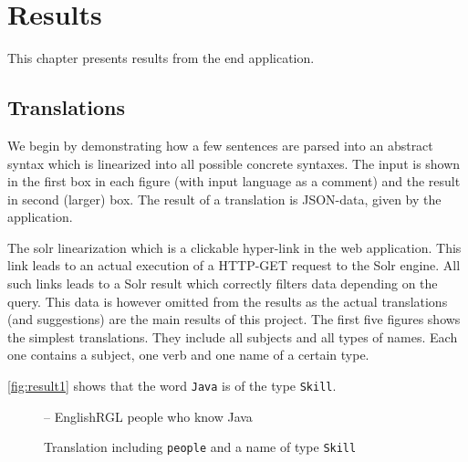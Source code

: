\chapter{Results}\label{ch:results}
This chapter presents results from the end application.

\section{Translations}
We begin by demonstrating how a few sentences are parsed into an abstract syntax which is linearized into all possible concrete syntaxes. The input is shown in the first box in each figure (with input language as a comment) and the result in second (larger) box. The result of a translation is JSON-data, given by the application.

The solr linearization which is a clickable hyper-link in the web application. This link leads to an actual execution of a HTTP-GET request to the Solr engine. All such links leads to a Solr result which correctly filters data depending on the query. This data is however omitted from the results as the actual translations (and suggestions) are the main results of this project.
\newline
\newline
The first five figures shows the simplest translations. They include all subjects and all types of names. Each one contains a subject, one verb and one name of a certain type.

\newpage
\autoref{fig:result1} shows that the word \texttt{Java} is of the type \texttt{Skill}.

\begin{figure}[H]
\begin{terminal}
-- EnglishRGL
people who know Java
\end{terminal}
\begin{json-small}
\end{json-small}
\caption{Translation including \texttt{people} and a name of type \texttt{Skill}\label{fig:result1}}
\end{figure}

